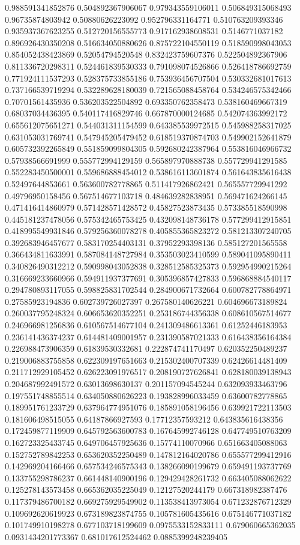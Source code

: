 \begin{table}
\begin{tabu}
\begin{sparkline}{10}
0.988591341852876 0.504892367906067 0.979343559106011 0.506849315068493 0.96735874803942 0.50880626223092 0.952796331164771 0.510763209393346 0.935937367623255 0.512720156555773 0.917162938608531 0.5146771037182 0.896926430350208 0.516634050880626 0.875722104550119 0.518590998043053 0.854052438423869 0.52054794520548 0.832423759607376 0.522504892367906 0.811336720298311 0.524461839530333 0.791098074526866 0.526418786692759 0.771924111537293 0.528375733855186 0.753936456707504 0.530332681017613 0.737166539719294 0.532289628180039 0.721565088458764 0.534246575342466 0.70701561435936 0.536203522504892 0.693350762358473 0.538160469667319 0.68037034436395 0.540117416829746 0.667870000124685 0.542074363992172 0.655612075651271 0.544031311154599 0.643385539972515 0.545988258317025 0.631053031769741 0.547945205479452 0.618519370874703 0.549902152641879 0.605732392265849 0.551859099804305 0.592680242387964 0.553816046966732 0.57938566691999 0.555772994129159 0.565897970888738 0.557729941291585 0.552283450500001 0.559686888454012 0.538616113601874 0.561643835616438 0.52497644853661 0.563600782778865 0.511417926862421 0.565557729941292 0.49796950158456 0.567514677103718 0.484639282838951 0.569471624266145 0.471416414860979 0.571428571428572 0.45827523873435 0.573385518590998 0.445181237478056 0.575342465753425 0.432098148736178 0.577299412915851 0.418995549931846 0.579256360078278 0.405855365823272 0.581213307240705 0.392683946457677 0.583170254403131 0.37952293398136 0.585127201565558 0.366434811633991 0.587084148727984 0.353503023410599 0.589041095890411 0.340826490312212 0.590998043052838 0.328512585325373 0.592954990215264 0.316669233660966 0.594911937377691 0.305396857427833 0.596868884540117 0.294780893117055 0.598825831702544 0.284900671732664 0.600782778864971 0.27585923194836 0.602739726027397 0.267580140626221 0.604696673189824 0.260037795248324 0.606653620352251 0.253186744356338 0.608610567514677 0.246966981256836 0.610567514677104 0.241309486613361 0.61252446183953 0.236141436374237 0.614481409001957 0.231390587021333 0.616438356164384 0.226988473906359 0.61839530332681 0.222874741170497 0.620352250489237 0.219006883755858 0.622309197651663 0.215302400707339 0.62426614481409 0.211712929105452 0.626223091976517 0.208190727626841 0.628180039138943 0.204687992491572 0.63013698630137 0.201157094545244 0.632093933463796 0.197551748855514 0.634050880626223 0.193828996033459 0.63600782778865 0.189951761233729 0.637964774951076 0.185891058196456 0.639921722113503 0.181606498515055 0.64187866927593 0.17712357593212 0.643835616438356 0.172459877119909 0.645792563600783 0.167645992746128 0.647749510763209 0.162723325433745 0.649706457925636 0.15774110070966 0.651663405088063 0.152752789842253 0.653620352250489 0.147812164020786 0.655577299412916 0.142969204166466 0.657534246575343 0.138266090199679 0.659491193737769 0.133755298786237 0.661448140900196 0.129429428261732 0.663405088062622 0.125278143573458 0.665362035225049 0.12127520244179 0.667318982387476 0.117379486700182 0.669275929549902 0.113538413973054 0.671232876712329 0.109692620619923 0.673189823874755 0.105781605435616 0.675146771037182 0.101749910198278 0.677103718199609 0.0975533152833111 0.679060665362035 0.0931434201773367 0.681017612524462 0.0885399248239405 
\end{sparkline}
\end{tabu}
\end{table}
